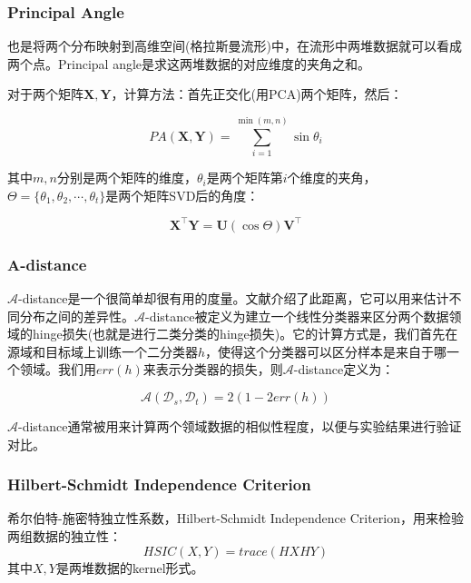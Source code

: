\subsubsection{Principal Angle}

也是将两个分布映射到高维空间(格拉斯曼流形)中，在流形中两堆数据就可以看成两个点。Principal angle是求这两堆数据的对应维度的夹角之和。

对于两个矩阵$\mathbf{X},\mathbf{Y}$，计算方法：首先正交化(用PCA)两个矩阵，然后：

\begin{equation}
\label{eq-dist-pa}
PA(\mathbf{X},\mathbf{Y})=\sum_{i=1}^{\min(m,n)} \sin \theta_i
\end{equation}

其中$m,n$分别是两个矩阵的维度，$\theta_i$是两个矩阵第$i$个维度的夹角，$\Theta=\{\theta_1,\theta_2,\cdots,\theta_t\}$是两个矩阵SVD后的角度：

\begin{equation}
	\mathbf{X}^\top\mathbf{Y}=\mathbf{U} (\cos \Theta) \mathbf{V}^\top
\end{equation}

\subsubsection{A-distance}

$\mathcal{A}$-distance是一个很简单却很有用的度量。文献\cite{ben2007analysis}介绍了此距离，它可以用来估计不同分布之间的差异性。$\mathcal{A}$-distance被定义为建立一个线性分类器来区分两个数据领域的hinge损失(也就是进行二类分类的hinge损失)。它的计算方式是，我们首先在源域和目标域上训练一个二分类器$h$，使得这个分类器可以区分样本是来自于哪一个领域。我们用$err(h)$来表示分类器的损失，则$\mathcal{A}$-distance定义为：

\begin{equation}
	\label{eq-dist-adist}
	\mathcal{A}(\mathcal{D}_s,\mathcal{D}_t) = 2(1 - 2 err(h))
\end{equation}

$\mathcal{A}$-distance通常被用来计算两个领域数据的相似性程度，以便与实验结果进行验证对比。

\subsubsection{Hilbert-Schmidt Independence Criterion}

希尔伯特-施密特独立性系数，Hilbert-Schmidt Independence Criterion，用来检验两组数据的独立性：
\begin{equation}
	HSIC(X,Y) = trace(HXHY)
\end{equation}
其中$X,Y$是两堆数据的kernel形式。

